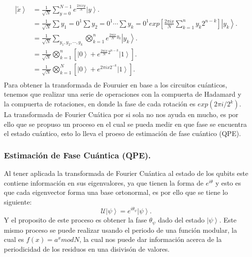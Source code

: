 \begin{align*}
    \left|\tilde{x} \right\rangle &= \frac{1}{\sqrt{N}} \sum\limits_{y=0}^{N-1} e^{\frac{2\pi i xy}{N} }\left|y \right\rangle.\\
    &=\frac{1}{\sqrt{N}}  \sum\limits{y_1=0}^1\sum\limits{y_2=0}^1 \cdots \sum\limits{y_k=0}^1 exp\left[\frac{2\pi i x}{N} \sum\limits_{k=1}^n y_k 2^{n-k}\right] \left| y_k \right\rangle.\\
    &= \frac{1}{\sqrt{N}} \sum\limits_{y_1,y_2,\cdots, y_k} \bigotimes\limits_{k=1}^n e^{\frac{2\pi i x}{N}y_k} \left| y_k \right\rangle.\\
    &=\frac{1}{\sqrt{N}} \bigotimes\limits_{k=1}^n \left[\left|0 \right\rangle+e^{\frac{2\pi i x}{N} 2^{n-k}} \left| 1\right\rangle  \right].\\
    &=\frac{1}{\sqrt{N}} \bigotimes\limits_{k=1}^N \left[\left|0 \right\rangle+e^{2\pi i x 2^{-k}} \left| 1\right\rangle  \right].\\
\end{align*}
Para obtener la transformada de Fouruier en base a los circuitos cuánticos, tenemos que realizar una serie de operaciones con la compuerta de Hadamard y la compuerta de rotaciones, en donde la 
fase de cada rotación es $exp(2\pi i / 2^k)$. La transformada de Fourier Cuática por si sola no nos ayuda en mucho, es por ello que se propuso un proceso en el cual
se pueda medir en que fase se encuentra el estado cuántico, esto lo lleva el proeso de estimación de fase cuántico (QPE).
\subsubsection{Estimación de Fase Cuántica (QPE).}

Al tener aplicada la transformada de Fourier Cuántica al estado de los qubits este contiene información en sus eigenvalores, ya que tienen la forma de
$e^{i\theta}$ y esto es que cada eigenvector forma una base ortonormal, es por ello que se tiene lo siguiente:
\begin{equation*}
    \mathcal{U} \left|\psi \right\rangle = e^{i\theta_\psi}\left|\psi \right\rangle.
\end{equation*}
Y el proposito de este proceso es obtener la fase $\theta_\psi$ dado del estado $\left|\psi \right\rangle$. Este mismo proceso se puede realizar usando 
el periodo de una función modular, la cual es $f(x)=a^xmodN$, la cual nos puede dar información acerca de la periodicidad de los residuos en una disivisón de valores.
